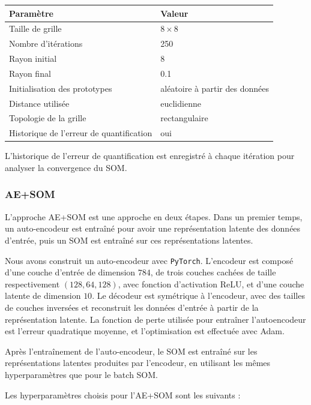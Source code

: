 \documentclass[12pt,a4paper]{report}
\begin{document}
\begin{center}
\begin{tabular}{ll}
\toprule
Paramètre & Valeur \\
\midrule
Taille de grille & $8 \times 8$ \\
Nombre d'itérations & 250 \\
Rayon initial & 8 \\
Rayon final & 0.1 \\
Initialisation des prototypes & aléatoire à partir des données \\
Distance utilisée & euclidienne \\
Topologie de la grille & rectangulaire \\
Historique de l'erreur de quantification & oui \\
\bottomrule
\end{tabular}
\end{center}

L'historique de l'erreur de quantification est enregistré à chaque itération pour analyser la convergence du SOM.

\subsubsection{AE+SOM}
L'approche AE+SOM est une approche en deux étapes. Dans un premier temps, un auto-encodeur est entraîné pour 
avoir une représentation latente des données d'entrée, puis un SOM est entraîné sur ces représentations latentes.

Nous avons construit un auto-encodeur avec \texttt{PyTorch}. 
L'encodeur est composé d'une couche d'entrée de dimension $784$, de trois couches cachées de taille respectivement 
$(128, 64, 128)$, avec fonction d'activation ReLU, et d'une couche latente de dimension $10$.
Le décodeur est symétrique à l'encodeur, avec des tailles de couches inversées et reconstruit les données d'entrée à partir de la représentation latente.
La fonction de perte utilisée pour entraîner l'autoencodeur est l'erreur quadratique moyenne, et l'optimisation est effectuée avec Adam.

Après l'entraînement de l'auto-encodeur, le SOM est entraîné sur les représentations latentes produites par l'encodeur,
en utilisant les mêmes hyperparamètres que pour le batch SOM.


Les hyperparamètres choisis pour l'AE+SOM sont les suivants :
\end{document}
